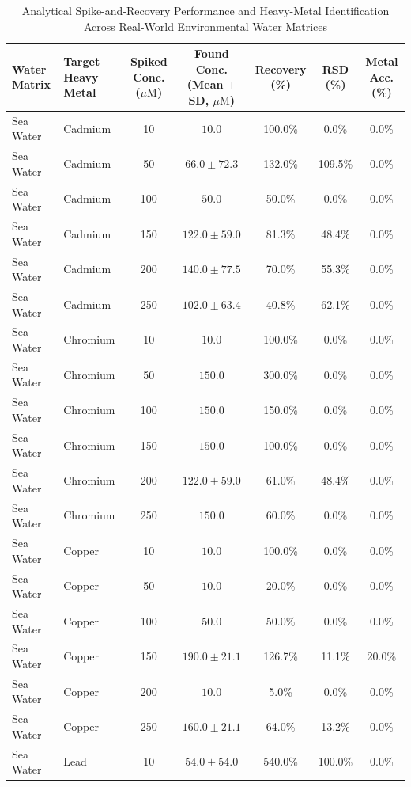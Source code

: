 \begin{table}[!t]
\caption{Analytical Spike-and-Recovery Performance and Heavy-Metal Identification Across Real-World Environmental Water Matrices}
\label{tab_real_world_spiking}
\centering
\begin{tabular}{llccccc}
\toprule
\textbf{Water Matrix} & \textbf{Target Heavy Metal} & \textbf{Spiked Conc. ($\mu\mathrm{M}$)} & \textbf{Found Conc. (Mean $\pm$ SD, $\mu\mathrm{M}$)} & \textbf{Recovery (\%)} & \textbf{RSD (\%)} & \textbf{Metal Acc. (\%)} \\
\midrule
Sea Water & Cadmium & 10 & $10.0$ & 100.0\% & 0.0\% & 0.0\% \\
Sea Water & Cadmium & 50 & $66.0 \pm 72.3$ & 132.0\% & 109.5\% & 0.0\% \\
Sea Water & Cadmium & 100 & $50.0$ & 50.0\% & 0.0\% & 0.0\% \\
Sea Water & Cadmium & 150 & $122.0 \pm 59.0$ & 81.3\% & 48.4\% & 0.0\% \\
Sea Water & Cadmium & 200 & $140.0 \pm 77.5$ & 70.0\% & 55.3\% & 0.0\% \\
Sea Water & Cadmium & 250 & $102.0 \pm 63.4$ & 40.8\% & 62.1\% & 0.0\% \\
Sea Water & Chromium & 10 & $10.0$ & 100.0\% & 0.0\% & 0.0\% \\
Sea Water & Chromium & 50 & $150.0$ & 300.0\% & 0.0\% & 0.0\% \\
Sea Water & Chromium & 100 & $150.0$ & 150.0\% & 0.0\% & 0.0\% \\
Sea Water & Chromium & 150 & $150.0$ & 100.0\% & 0.0\% & 0.0\% \\
Sea Water & Chromium & 200 & $122.0 \pm 59.0$ & 61.0\% & 48.4\% & 0.0\% \\
Sea Water & Chromium & 250 & $150.0$ & 60.0\% & 0.0\% & 0.0\% \\
Sea Water & Copper & 10 & $10.0$ & 100.0\% & 0.0\% & 0.0\% \\
Sea Water & Copper & 50 & $10.0$ & 20.0\% & 0.0\% & 0.0\% \\
Sea Water & Copper & 100 & $50.0$ & 50.0\% & 0.0\% & 0.0\% \\
Sea Water & Copper & 150 & $190.0 \pm 21.1$ & 126.7\% & 11.1\% & 20.0\% \\
Sea Water & Copper & 200 & $10.0$ & 5.0\% & 0.0\% & 0.0\% \\
Sea Water & Copper & 250 & $160.0 \pm 21.1$ & 64.0\% & 13.2\% & 0.0\% \\
Sea Water & Lead & 10 & $54.0 \pm 54.0$ & 540.0\% & 100.0\% & 0.0\% \\

\end{tabular}
\end{table}
